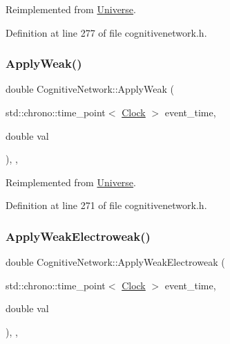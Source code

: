 Reimplemented from \mbox{\hyperlink{class_universe_af7becebb347be9a85541d96a3eca1ca7}{Universe}}.



Definition at line 277 of file cognitivenetwork.\+h.

\mbox{\label{class_cognitive_network_a46a15b24bd61049fa1c4f635268086a1}} 
\subsubsection{\texorpdfstring{Apply\+Weak()}{ApplyWeak()}}
{\footnotesize\ttfamily double Cognitive\+Network\+::\+Apply\+Weak (\begin{DoxyParamCaption}\item[{std\+::chrono\+::time\+\_\+point$<$ \mbox{\hyperlink{universe_8h_a0ef8d951d1ca5ab3cfaf7ab4c7a6fd80}{Clock}} $>$}]{event\+\_\+time,  }\item[{double}]{val }\end{DoxyParamCaption})\hspace{0.3cm}{\ttfamily [inline]}, {\ttfamily [final]}, {\ttfamily [virtual]}}



Reimplemented from \mbox{\hyperlink{class_universe_a6d1226b3adec3c42a833afdbb6a65a92}{Universe}}.



Definition at line 271 of file cognitivenetwork.\+h.

\mbox{\label{class_cognitive_network_ab8bc213d2806f0dc49c1284bf934fc24}} 
\subsubsection{\texorpdfstring{Apply\+Weak\+Electroweak()}{ApplyWeakElectroweak()}}
{\footnotesize\ttfamily double Cognitive\+Network\+::\+Apply\+Weak\+Electroweak (\begin{DoxyParamCaption}\item[{std\+::chrono\+::time\+\_\+point$<$ \mbox{\hyperlink{universe_8h_a0ef8d951d1ca5ab3cfaf7ab4c7a6fd80}{Clock}} $>$}]{event\+\_\+time,  }\item[{double}]{val }\end{DoxyParamCaption})\hspace{0.3cm}{\ttfamily [inline]}, {\ttfamily [final]}, {\ttfamily [virtual]}}



